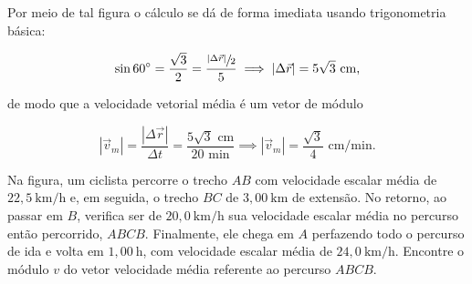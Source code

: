 \begin{exemplo}[Nível II]
Por meio de tal figura o cálculo se dá de forma imediata usando trigonometria básica:

$$ \sin 60^\circ = \dfrac{\sqrt3}{2}=\dfrac{\sfrac{|\Delta \vec{r}|}{2}}{5} \implies |\Delta \vec{r}| = 5\sqrt3 \text{ cm,}$$

\noindent de modo que a velocidade vetorial média é um vetor de módulo

$$ |\vec{v}_m| = \dfrac{|\Delta \vec{r}|}{\Delta t}= \dfrac{5 \sqrt 3 \text{ cm}}{20 \text{ min}} \implies \boxed{|\vec{v}_m| =\dfrac{\sqrt 3}{4} \text{ cm/min.}}$$
    
\end{exemplo}


\vspace{0.3cm}


\begin{exemplo}\label{exemplo_cinematicavetorial_velocidadevetorialex03}

Na figura, um ciclista percorre o trecho $AB$ com velocidade escalar média de $22{,}5\ \text{km/h}$ e, em seguida, o trecho $BC$ de $3{,}00\ \text{km}$ de extensão.
No retorno, ao passar em $B$, verifica ser de $20{,}0\ \text{km/h}$ sua velocidade escalar média no percurso então percorrido, $ABCB$.
Finalmente, ele chega em $A$ perfazendo todo o percurso de ida e volta em $1{,}00\ \text{h}$, com velocidade escalar média de $24{,}0\ \text{km/h}$.
Encontre o módulo $v$ do vetor velocidade média referente ao percurso $ABCB$.

\vspace{0.8cm}

\begin{center}
\end{center}





\end{exemplo}

